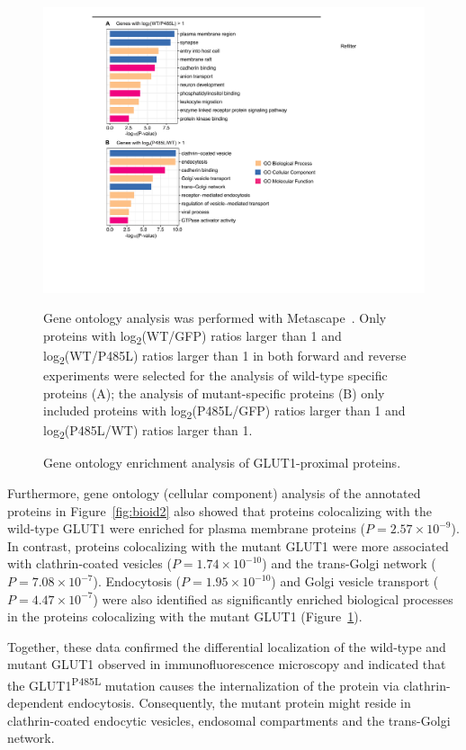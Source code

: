 \begin{figure}[h]
\centering
\includegraphics[scale=0.7]{Figures/GO}
\caption{Gene ontology enrichment analysis of GLUT1-proximal proteins.}
\vspace*{-3mm}
\small \justify
Gene ontology analysis was performed with Metascape~\cite{Tripathi}. Only proteins with log\textsubscript{2}(WT/GFP) ratios larger than 1 and log\textsubscript{2}(WT/P485L) ratios larger than 1 in both forward and reverse experiments were selected for the analysis of wild-type specific proteins (A); the analysis of mutant-specific proteins (B) only included proteins with log\textsubscript{2}(P485L/GFP) ratios larger than 1 and log\textsubscript{2}(P485L/WT) ratios larger than 1.
\label{fig:go}
\end{figure}
Furthermore, gene ontology (cellular component) analysis of the annotated proteins in Figure~\ref{fig:bioid2} also showed that proteins colocalizing with the wild-type GLUT1 were enriched for plasma membrane proteins ($P=2.57\times 10^{-9}$). In contrast, proteins colocalizing with the mutant GLUT1 were more associated with clathrin-coated vesicles ($P=1.74\times 10^{-10}$) and the trans-Golgi network ($P=7.08\times 10^{-7}$). Endocytosis ($P=1.95\times 10^{-10}$) and Golgi vesicle transport ($P=4.47\times 10^{-7}$) were also identified as significantly enriched biological processes in the proteins colocalizing with the mutant GLUT1 (Figure~\ref{fig:go}).

Together, these data confirmed the differential localization of the wild-type and mutant GLUT1 observed in immunofluorescence microscopy and indicated that the GLUT1\textsuperscript{P485L} mutation causes the internalization of the protein via clathrin-dependent endocytosis. Consequently, the mutant protein might reside in clathrin-coated endocytic vesicles, endosomal compartments and the trans-Golgi network.
